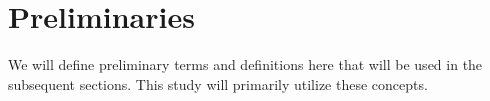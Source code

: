 \documentclass{article} %
\theoremstyle{bfnote}
\newtheorem{definition}[theorem]{Definition}
\newtheorem{remark}[theorem]{Remark}
\begin{document}
\section{Preliminaries}
We will define preliminary terms and definitions here that will be used in the subsequent sections. This study will primarily utilize these concepts.


%
%	
%	
%	


%
\end{document}
